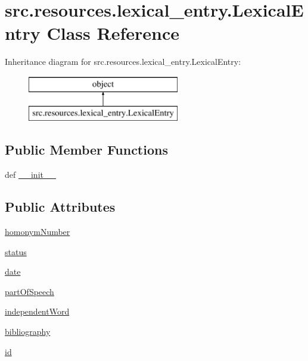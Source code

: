 \hypertarget{classsrc_1_1resources_1_1lexical__entry_1_1_lexical_entry}{\section{src.\+resources.\+lexical\+\_\+entry.\+Lexical\+Entry Class Reference}
\label{classsrc_1_1resources_1_1lexical__entry_1_1_lexical_entry}
}
Inheritance diagram for src.\+resources.\+lexical\+\_\+entry.\+Lexical\+Entry\+:\begin{figure}[H]
\begin{center}
\leavevmode
\includegraphics[height=2.000000cm]{classsrc_1_1resources_1_1lexical__entry_1_1_lexical_entry}
\end{center}
\end{figure}
\subsection*{Public Member Functions}
\begin{DoxyCompactItemize}
\item 
def \hyperlink{classsrc_1_1resources_1_1lexical__entry_1_1_lexical_entry_a5a2fb447cf525d83fb9618b71362e090}{\+\_\+\+\_\+init\+\_\+\+\_\+}
\end{DoxyCompactItemize}
\subsection*{Public Attributes}
\begin{DoxyCompactItemize}
\item 
\hyperlink{classsrc_1_1resources_1_1lexical__entry_1_1_lexical_entry_a96d489c77c1762c5d99258b33a5188d7}{homonym\+Number}
\item 
\hyperlink{classsrc_1_1resources_1_1lexical__entry_1_1_lexical_entry_a121e70fe8e1d31e711d7fb62d1de82bd}{status}
\item 
\hyperlink{classsrc_1_1resources_1_1lexical__entry_1_1_lexical_entry_a5b2b53f127e66404beaf084ff19e258d}{date}
\item 
\hyperlink{classsrc_1_1resources_1_1lexical__entry_1_1_lexical_entry_a46b822c5855f5360e5023f35d66478f0}{part\+Of\+Speech}
\item 
\hyperlink{classsrc_1_1resources_1_1lexical__entry_1_1_lexical_entry_a02159532576e712c6818a84130d0c8dc}{independent\+Word}
\item 
\hyperlink{classsrc_1_1resources_1_1lexical__entry_1_1_lexical_entry_afe7e2fa1eb3e36ab9d792ae6504fa1a5}{bibliography}
\item 
\hyperlink{classsrc_1_1resources_1_1lexical__entry_1_1_lexical_entry_a82f37d6c2d9c65a0272a0a671b64eddc}{id}
\end{DoxyCompactItemize}


